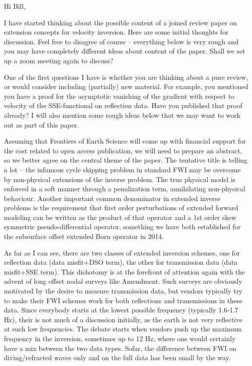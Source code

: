 \documentclass[10pt]{article}
\begin{document}
Hi Bill,

I have started thinking about the possible content of a joined review paper on extension concepts for velocity inversion. Here are some initial thoughts for discussion. Feel free to disagree of course -- everything below is very rough and you may have completely different ideas about content of the paper. Shall we set up a zoom meeting again to discuss?

One of the first questions I have is whether you are thinking about a pure review, or would consider including (partially) new material. For example, you mentioned you have a proof for the asymptotic vanishing of the gradient with respect to velocity of the SSE-functional on reflection data. Have you published that proof already? I will also mention some rough ideas below that we may want to work out as part of this paper.

Assuming that Frontiers of Earth Science will come up with financial support for the cost related to open access publication, we will need to prepare an abstract, so we better agree on the central theme of the paper. The tentative title is telling a lot -- the infamous cycle skipping problem in standard FWI may be overcome by non-physical extensions of the inverse problem. The true physical model is enforced in a soft manner through a penalization term, annihilating non-physical behaviour. Another important common denominator in extended inverse problems is the requirement that first order perturbations of extended forward modeling can be written as the product of that operator and a 1st order skew symmetric pseudo-differential operator, something we have both established for the subsurface offset extended Born operator in 2014.

As far as I can see, there are two classes of extended inversion schemes, one for reflection data (data misfit+DSO term), the other for transmission data (data misfit+SSE term). This dichotomy is at the forefront of attention again with the advent of long offset nodal surveys like Amendment. Such surveys are obviously motivated by the desire to measure transmission data, but vendors typically try to make their FWI schemes work for both reflections and transmissions in these data. Since everybody starts at the lowest possible frequency (typically 1.6-1.7 Hz), their is not much of a discussion initially, as the earth is not very reflective at such low frequencies. The debate starts when vendors push up the maximum frequency in the inversion, sometimes up to 12 Hz, where one would certainly have a mix between the two data types. Sofar, the difference between  FWI on diving/refracted waves only and on the full data has been small by the way.
\end{document}
